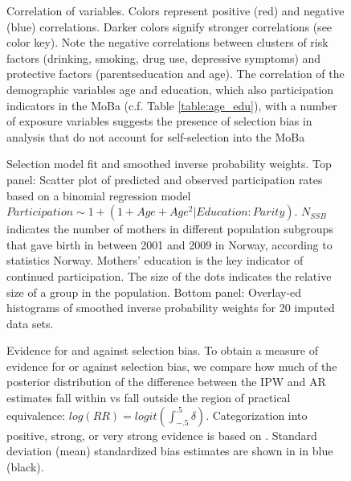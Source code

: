 \documentclass[]{article}
\begin{document}
%	

\begin{figure}[ht]
	\centering 
	\caption{Correlation of variables. Colors represent positive (red) and negative (blue) correlations. Darker colors signify stronger correlations (see color key). Note the negative correlations between clusters of risk factors (drinking, smoking, drug use, depressive symptoms) and protective factors (parents\textquotesingle \space education and age). The correlation of the  demographic variables age and education, which also participation indicators in the MoBa (c.f. Table \ref{table:age_edu}), with a number of exposure variables suggests the presence of selection bias in analysis that do not account for self-selection into the MoBa}
	\label{fig:covariation}
\end{figure}


\begin{figure}[ht]
	\centering
    	
	\caption{Selection model fit and smoothed inverse probability weights. Top panel: Scatter plot of predicted and observed participation rates based on a binomial regression model $Participation \sim 1 + (1 + Age + Age^2 | Education:Parity)$. $N_{SSB}$ indicates the number of mothers in different population subgroups that gave birth in between 2001 and 2009 in Norway, according to statistics Norway. Mothers' education is the key indicator of continued participation. The size of the dots indicates the relative size of a group in the population. Bottom panel: Overlay-ed histograms of smoothed inverse probability weights for 20 imputed data sets.}
	\label{fig:IPW}
\end{figure}


\begin{figure}[ht]
	\caption{Evidence for and against selection bias. To obtain a measure of evidence for or against selection bias, we compare how much of the posterior distribution of the difference between the IPW and AR estimates fall within vs fall outside the region of practical equivalence: $log(RR) = logit(\int_{-.5}^{.5}\delta)$. Categorization into positive, strong, or very strong evidence is based on \supercite{Kass1995-uv}. Standard deviation (mean) standardized bias estimates are shown in in blue (black).} 
	\label{fig:logRRs}
\end{figure}
\end{document}
